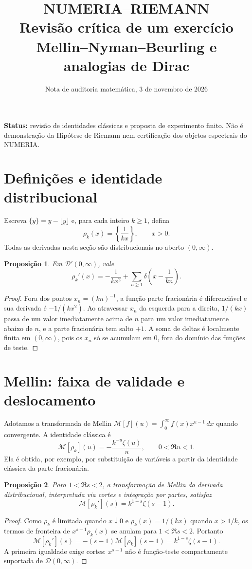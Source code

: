 \documentclass[11pt,a4paper]{article}
\title{NUMERIA--RIEMANN\\ Revisão crítica de um exercício Mellin--Nyman--Beurling e analogias de Dirac}
\author{Nota de auditoria matemática, 3 de novembro de 2026}
\date{}
\newtheorem{proposicao}{Proposição}
\begin{document}
\maketitle
\noindent\textbf{Status:} revisão de identidades clássicas e proposta de experimento finito. Não é demonstração da Hipótese de Riemann nem certificação dos objetos espectrais do NUMERIA.

\section{Definições e identidade distribucional}
Escreva $\{y\}=y-\lfloor y\rfloor$ e, para cada inteiro $k\ge1$, defina
\[
\rho_k(x)=\left\{\frac1{kx}\right\},\qquad x>0.
\]
Todas as derivadas nesta seção são distribucionais no aberto $(0,\infty)$.

\begin{proposicao}
Em $\mathcal D'(0,\infty)$, vale
\[
\rho_k'(x)=-\frac{1}{kx^2}+\sum_{n\ge1}\delta\left(x-\frac1{kn}\right).
\]
\end{proposicao}
\begin{proof}
Fora dos pontos $x_n=(kn)^{-1}$, a função parte fracionária é diferenciável e sua derivada é $-1/(kx^2)$. Ao atravessar $x_n$ da esquerda para a direita, $1/(kx)$ passa de um valor imediatamente acima de $n$ para um valor imediatamente abaixo de $n$, e a parte fracionária tem salto $+1$. A soma de deltas é localmente finita em $(0,\infty)$, pois os $x_n$ só se acumulam em $0$, fora do domínio das funções de teste.
\end{proof}

\section{Mellin: faixa de validade e deslocamento}
Adotamos a transformada de Mellin $\mathcal M[f](u)=\int_0^\infty f(x)x^{u-1}\,dx$ quando convergente. A identidade clássica é
\[
\mathcal M[\rho_k](u)=-\frac{k^{-u}\zeta(u)}{u},\qquad 0<\Re u<1.
\]
Ela é obtida, por exemplo, por substituição de variáveis a partir da identidade clássica da parte fracionária.

\begin{proposicao}
Para $1<\Re s<2$, a transformação de Mellin da derivada distribucional, interpretada via cortes e integração por partes, satisfaz
\[
\boxed{\mathcal M[\rho_k'](s)=k^{1-s}\zeta(s-1).}
\]
\end{proposicao}
\begin{proof}
Como $\rho_k$ é limitada quando $x\downarrow0$ e $\rho_k(x)=1/(kx)$ quando $x>1/k$, os termos de fronteira de $x^{s-1}\rho_k(x)$ se anulam para $1<\Re s<2$. Portanto
\[
\mathcal M[\rho_k'](s)=-(s-1)\mathcal M[\rho_k](s-1)
=k^{1-s}\zeta(s-1).
\]
A primeira igualdade exige cortes: $x^{s-1}$ não é função-teste compactamente suportada de $\mathcal D(0,\infty)$.
\end{proof}
\end{document}
